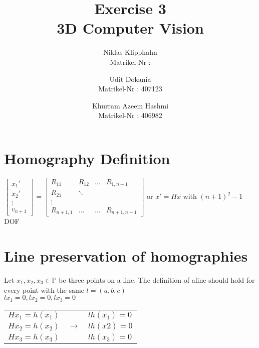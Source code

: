 \documentclass[a4paper, twoside, english]{article}
\title{Exercise 3 \\ 3D Computer Vision}  %
\author{Niklas Klipphahn \\ Matrikel-Nr : 
\and
Udit Dokania \\ Matrikel-Nr : 407123
\and
Khurram Azeem Hashmi \\ Matrikel-Nr : 406982
}                       %
\begin{document}
	
\maketitle

\section{Homography Definition}
$
\begin{bmatrix}
	x_1'\\
	x_2'\\
	\vdots\\
	v_{n+1}
\end{bmatrix}
= 
\begin{bmatrix}
	R_{11} & R_{12} & \dots & R_{1,n+1}\\
	R_{21} & \ddots \\
	\vdots \\
	R_{n+1,1} & \dots & \dots & R_{n+1,n+1}
\end{bmatrix}
$
or $x' = Hx$ with $(n+1)^2 -1$ DOF

\section{Line preservation of homographies}

Let $x_1,x_2,x_3 \in \mathbb{P}$ be three points on a line.
The definition of aline should hold for every point with the same $l=(a,b,c)$\\
$l x_1 = 0, l x_2 = 0, l x_3 = 0$\\

\begin{tabular}{lll}
$H x_1 = h(x_1)$ & &$ l h(x_1)=0$\\
$H x_2 = h(x_2)$ & $\rightarrow$ & $l h(x2) = 0$\\
$H x_3 = h(x_3)$ & & $l h(x_3) = 0$	
\end{tabular}
\end{document}
